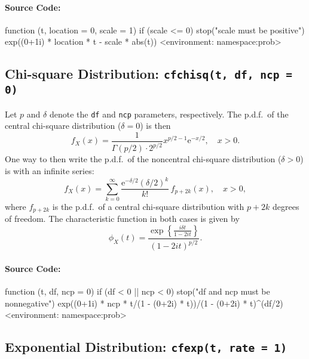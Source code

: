 \documentclass[english]{article}
\newcommand{\me}{\mathrm{e}}
\begin{document}
\paragraph*{Source Code:}

\begin{Schunk}
\begin{Soutput}
function (t, location = 0, scale = 1) 
{
    if (scale <= 0) 
        stop("scale must be positive")
    exp((0+1i) * location * t - scale * abs(t))
}
<environment: namespace:prob>
\end{Soutput}
\end{Schunk}


\subsection{Chi-square Distribution: \texttt{cfchisq(t, df, ncp = 0)}}

Let $p$ and $\delta$ denote the \texttt{df} and \texttt{ncp} parameters,
respectively. The p.d.f.~of the central chi-square distribution ($\delta=0$)
is then\[
f_{X}(x)=\frac{1}{\Gamma(p/2)\cdot2^{p/2}}x^{p/2-1}\me^{-x/2},\quad x>0.\]
One way to then write the p.d.f.~of the noncentral chi-square distribution
($\delta>0$) is with an infinite series:\[
f_{X}(x)=\sum_{k=0}^{\infty}\frac{\me^{-\delta/2}(\delta/2)^{k}}{k!}\, f_{p+2k}(x),\quad x>0,\]
where $f_{p+2k}$ is the p.d.f.~of a central chi-square distribution
with $p+2k$ degrees of freedom. The characteristic function in both
cases is given by\[
\phi_{X}(t)=\frac{\exp\left\{ \frac{i\delta t}{1-2it}\right\} }{(1-2it)^{p/2}}.\]



\paragraph*{Source Code:}

\begin{Schunk}
\begin{Soutput}
function (t, df, ncp = 0) 
{
    if (df < 0 || ncp < 0) 
        stop("df and ncp must be nonnegative")
    exp((0+1i) * ncp * t/(1 - (0+2i) * t))/(1 - (0+2i) * t)^(df/2)
}
<environment: namespace:prob>
\end{Soutput}
\end{Schunk}


\subsection{Exponential Distribution: \texttt{cfexp(t, rate = 1)}}
\end{document}
